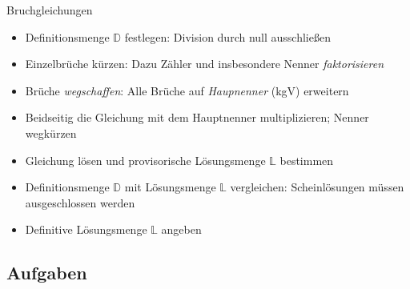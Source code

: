 %  
%  
%
%
%
%  
\begin{rezept}{Bruchgleichungen}{}
  \begin{itemize}
    \item Definitionsmenge $\mathbb{D}$ festlegen: Division durch null ausschließen
  \item Einzelbrüche kürzen: Dazu Zähler und insbesondere Nenner \textit{faktorisieren}
  \item Brüche \textit{wegschaffen}: Alle Brüche auf
    \textit{Haupnenner} (kgV) erweitern
  \item Beidseitig die Gleichung mit dem Hauptnenner
    multiplizieren; Nenner wegkürzen
  \item Gleichung lösen und provisorische Lösungsmenge $\mathbb{L}$
    bestimmen
  \item Definitionsmenge $\mathbb{D}$ mit Lösungsmenge $\mathbb{L}$
    vergleichen: Scheinlösungen müssen ausgeschlossen werden
  \item Definitive Lösungsmenge $\mathbb{L}$ angeben
    \end{itemize}
\end{rezept}

\subsection*{Aufgaben}



%

\newpage
